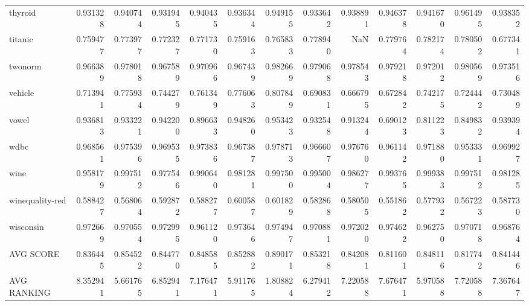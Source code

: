 \begin{tabular}{lrrrrrrrrrrrr}
thyroid         &   0.931328 &  0.940744 &  0.931945 &  0.940435 &  0.936344 &  0.949155 &  0.933642 &  0.938891 &  0.946378 &  0.941670 &  0.961495 &  0.938352 \\
titanic         &   0.759477 &  0.773977 &  0.772327 &  0.771730 &  0.759163 &  0.765833 &  0.778940 &       NaN &  0.779764 &  0.782174 &  0.780502 &  0.677341 \\
twonorm         &   0.966389 &  0.978018 &  0.967589 &  0.970966 &  0.967439 &  0.982669 &  0.979068 &  0.978543 &  0.979218 &  0.972012 &  0.980569 &  0.973516 \\
vehicle         &   0.713941 &  0.775934 &  0.744279 &  0.761349 &  0.776063 &  0.807849 &  0.690831 &  0.666795 &  0.672842 &  0.742175 &  0.724442 &  0.730489 \\
vowel           &   0.936813 &  0.933221 &  0.942200 &  0.896633 &  0.948260 &  0.953423 &  0.932548 &  0.913244 &  0.690123 &  0.811223 &  0.849832 &  0.939394 \\
wdbc            &   0.968561 &  0.975396 &  0.969535 &  0.973836 &  0.967387 &  0.978713 &  0.966607 &  0.976760 &  0.961142 &  0.971880 &  0.953331 &  0.969927 \\
wine            &   0.958179 &  0.997512 &  0.977546 &  0.990640 &  0.981281 &  0.997500 &  0.995004 &  0.986277 &  0.993765 &  0.999383 &  0.997512 &  0.981285 \\
winequality-red &   0.588427 &  0.568064 &  0.592872 &  0.588277 &  0.600587 &  0.601829 &  0.582868 &  0.580505 &  0.551862 &  0.577932 &  0.567223 &  0.587730 \\
wisconsin       &   0.972669 &  0.970554 &  0.972995 &  0.961120 &  0.973646 &  0.974947 &  0.970881 &  0.972020 &  0.974622 &  0.962750 &  0.970718 &  0.968764 \\
AVG SCORE       &   0.836445 &  0.854522 &  0.844770 &  0.848585 &  0.852882 &  0.890171 &  0.853218 &  0.842081 &  0.811601 &  0.848116 &  0.817742 &  0.841446 \\
AVG RANKING     &   8.352941 &  5.661765 &  6.852941 &  7.176471 &  5.911765 &  1.808824 &  6.279412 &  7.220588 &  7.676471 &  5.970588 &  7.720588 &  7.367647 \\
\bottomrule
\end{tabular}
